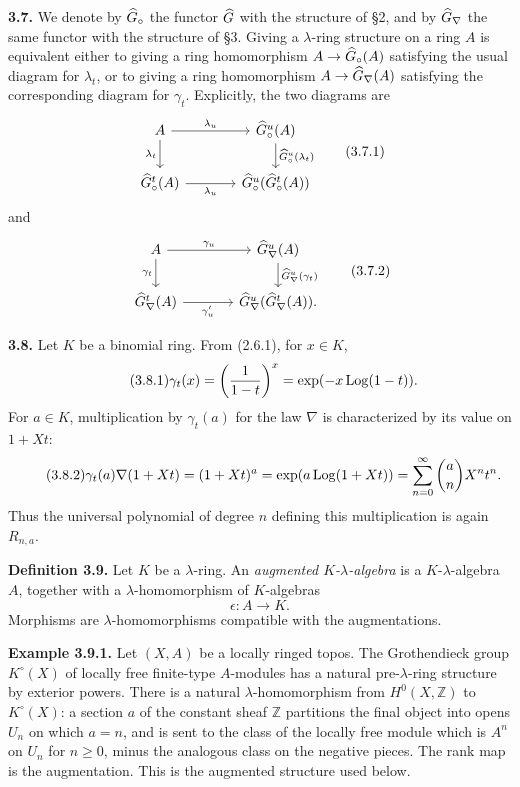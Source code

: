 \documentclass[11pt]{article}
\begin{document}
\textbf{3.7.} We denote by \(\widehat G_{\circ}\) the functor \(\widehat G\) with the structure of §2, and by \(\widehat G_{\nabla}\) the same functor with the structure of §3. Giving a \(\lambda\)-ring structure on a ring \(A\) is equivalent either to giving a ring homomorphism \(A\to\widehat G_{\circ}(A)\) satisfying the usual diagram for \(\lambda_t\), or to giving a ring homomorphism \(A\to\widehat G_{\nabla}(A)\) satisfying the corresponding diagram for \(\gamma_t\). Explicitly, the two diagrams are
\[
\begin{tikzcd}[column sep=large]
A \arrow[r,"\lambda_u"] \arrow[d,"\lambda_t"'] & \Gcirc^u(A) \arrow[d,"\Gcirc^u(\lambda_t)"]\\
\Gcirc^t(A) \arrow[r,"\lambda_u"'] & \Gcirc^u(\Gcirc^t(A))
\end{tikzcd}
\tag{3.7.1}
\]
and
\[
\begin{tikzcd}[column sep=large]
A \arrow[r,"\gamma_u"] \arrow[d,"\gamma_t"'] & \Gnabla^u(A) \arrow[d,"\Gnabla^u(\gamma_t)"]\\
\Gnabla^t(A) \arrow[r,"\gamma'_u"'] & \Gnabla^u(\Gnabla^t(A)).
\end{tikzcd}
\tag{3.7.2}
\]

\textbf{3.8.} Let \(K\) be a binomial ring. From (2.6.1), for \(x\in K\),
\begin{equation}\tag{3.8.1}
  \gamma_t(x)=\left(\frac1{1-t}\right)^x
  =\exp(-x\operatorname{Log}(1-t)).
\end{equation}
For \(a\in K\), multiplication by \(\gamma_t(a)\) for the law \(\nabla\) is characterized by its value on \(1+Xt\):
\begin{equation}\tag{3.8.2}
  \gamma_t(a)\nabla(1+Xt)
  =(1+Xt)^a
  =\exp(a\operatorname{Log}(1+Xt))
  =\sum_{n=0}^{\infty}\binom{a}{n}X^nt^n .
\end{equation}
Thus the universal polynomial of degree \(n\) defining this multiplication is again \(R_{n,a}\).

\textbf{Definition 3.9.} Let \(K\) be a \(\lambda\)-ring. An \emph{augmented \(K\)-\(\lambda\)-algebra} is a \(K\)-\(\lambda\)-algebra \(A\), together with a \(\lambda\)-homomorphism of \(K\)-algebras
\[
  \epsilon:A\longrightarrow K.
\]
Morphisms are \(\lambda\)-homomorphisms compatible with the augmentations.

\textbf{Example 3.9.1.} Let \((X,A)\) be a locally ringed topos. The Grothendieck group \(K^\circ(X)\) of locally free finite-type \(A\)-modules has a natural pre-\(\lambda\)-ring structure by exterior powers. There is a natural \(\lambda\)-homomorphism from \(H^0(X,\mathbb Z)\) to \(K^\circ(X)\): a section \(a\) of the constant sheaf \(\mathbb Z\) partitions the final object into opens \(U_n\) on which \(a=n\), and is sent to the class of the locally free module which is \(A^n\) on \(U_n\) for \(n\ge0\), minus the analogous class on the negative pieces. The rank map is the augmentation. This is the augmented structure used below.
\end{document}
